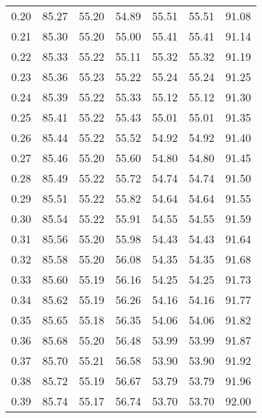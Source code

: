 \begin{tabular}{|c|c|c|c|c|c|c|}
      0.20 &     85.27 &     55.20 &      54.89 &   55.51 &      55.51 &         91.08 \\
      0.21 &     85.30 &     55.20 &      55.00 &   55.41 &      55.41 &         91.14 \\
      0.22 &     85.33 &     55.22 &      55.11 &   55.32 &      55.32 &         91.19 \\
      0.23 &     85.36 &     55.23 &      55.22 &   55.24 &      55.24 &         91.25 \\
      0.24 &     85.39 &     55.22 &      55.33 &   55.12 &      55.12 &         91.30 \\
      0.25 &     85.41 &     55.22 &      55.43 &   55.01 &      55.01 &         91.35 \\
      0.26 &     85.44 &     55.22 &      55.52 &   54.92 &      54.92 &         91.40 \\
      0.27 &     85.46 &     55.20 &      55.60 &   54.80 &      54.80 &         91.45 \\
      0.28 &     85.49 &     55.22 &      55.72 &   54.74 &      54.74 &         91.50 \\
      0.29 &     85.51 &     55.22 &      55.82 &   54.64 &      54.64 &         91.55 \\
      0.30 &     85.54 &     55.22 &      55.91 &   54.55 &      54.55 &         91.59 \\
      0.31 &     85.56 &     55.20 &      55.98 &   54.43 &      54.43 &         91.64 \\
      0.32 &     85.58 &     55.20 &      56.08 &   54.35 &      54.35 &         91.68 \\
      0.33 &     85.60 &     55.19 &      56.16 &   54.25 &      54.25 &         91.73 \\
      0.34 &     85.62 &     55.19 &      56.26 &   54.16 &      54.16 &         91.77 \\
      0.35 &     85.65 &     55.18 &      56.35 &   54.06 &      54.06 &         91.82 \\
      0.36 &     85.68 &     55.20 &      56.48 &   53.99 &      53.99 &         91.87 \\
      0.37 &     85.70 &     55.21 &      56.58 &   53.90 &      53.90 &         91.92 \\
      0.38 &     85.72 &     55.19 &      56.67 &   53.79 &      53.79 &         91.96 \\
      0.39 &     85.74 &     55.17 &      56.74 &   53.70 &      53.70 &         92.00 \\

\end{tabular}
